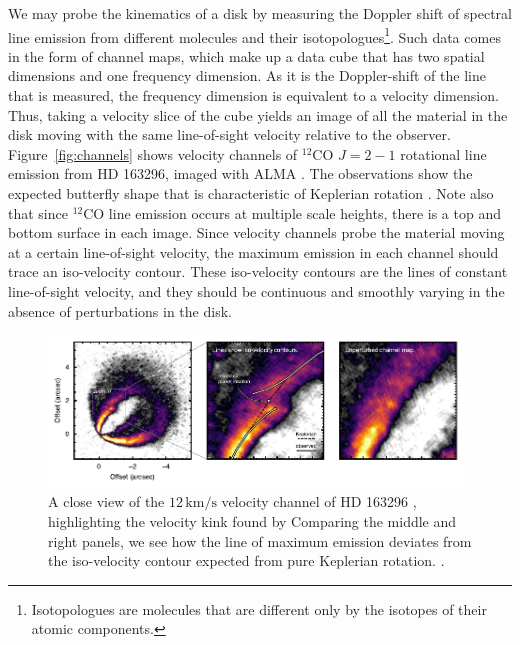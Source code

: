 We may probe the kinematics of a disk by measuring the Doppler shift of spectral line emission from different molecules and their isotopologues\footnote{Isotopologues are molecules that are different only by the isotopes of their atomic components.}.
Such data comes in the form of channel maps, which make up a data cube that has two spatial dimensions and one frequency dimension.
As it is the Doppler-shift of the line that is measured, the frequency dimension is equivalent to a velocity dimension.
Thus, taking a velocity slice of the cube yields an image of all the material in the disk moving with the same line-of-sight velocity relative to the observer.
Figure~\ref{fig:channels} shows velocity channels of $^{12}$CO $J=2-1$ rotational line emission from HD 163296, imaged with ALMA \citep{andrews2018}.
The observations show the expected butterfly shape that is characteristic of Keplerian rotation \citep{degregorio-monsalvo2013}.
Note also that since $^{12}$CO line emission occurs at multiple scale heights, there is a top and bottom surface in each image.
Since velocity channels probe the material moving at a certain line-of-sight velocity, the maximum emission in each channel should trace an iso-velocity contour.
These iso-velocity contours are the lines of constant line-of-sight velocity, and they should be continuous and smoothly varying in the absence of perturbations in the disk.

\begin{figure}
    \centering
    \includegraphics[width = 0.98\textwidth]{figures/HD163296_channels.pdf}
    \caption{A close view of the $12 \,\mathrm{km/s}$ velocity channel of HD 163296 \citep{andrews2018}, highlighting the velocity kink found by \citet{pinte2018a} Comparing the middle and right panels, we see how the line of maximum emission deviates from the iso-velocity contour expected from pure Keplerian rotation. \citep{diskdynamicscollaboration2020}.}
    \label{fig:velocity_kink}
\end{figure}

